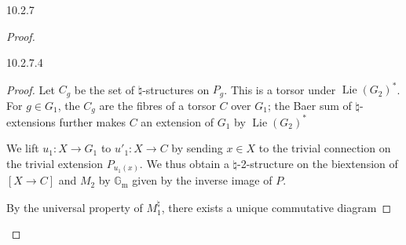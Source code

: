 \begin{construction}{10.2.7}
\begin{proof}
\begin{proposition}{10.2.7.4}
\begin{proof}
          Let \(C_g\) be the set of \(\natural \)-structures on \(P_g\).
          This is a torsor under \(\operatorname {Lie}(G_2)^*\).
          For \(g\in  G_1\), the \(C_g\) are the fibres of a torsor \(C\) over \(G_1\);
          the Baer sum of \(\natural \)-extensions further makes \(C\) an extension of \(G_1\) by \(\operatorname {Lie}(G_2)^*\)
          
          We lift \(u_1\colon  X\to  G_1\) to \(u'_1\colon  X\to  C\) by sending \(x\in  X\) to the trivial connection on the trivial extension \(P_{u_1(x)}\).
          We thus obtain a \(\natural \)-2-structure on the biextension of \([X\to  C]\) and \(M_2\) by \(\mathbb {G}_\mathrm {m}\) given by the inverse image of \(P\).\par{}By the universal property of \(M_1^\natural \), there exists a unique commutative diagram

          



\end{proof}
\end{proposition}
\end{proof}
\end{construction}
